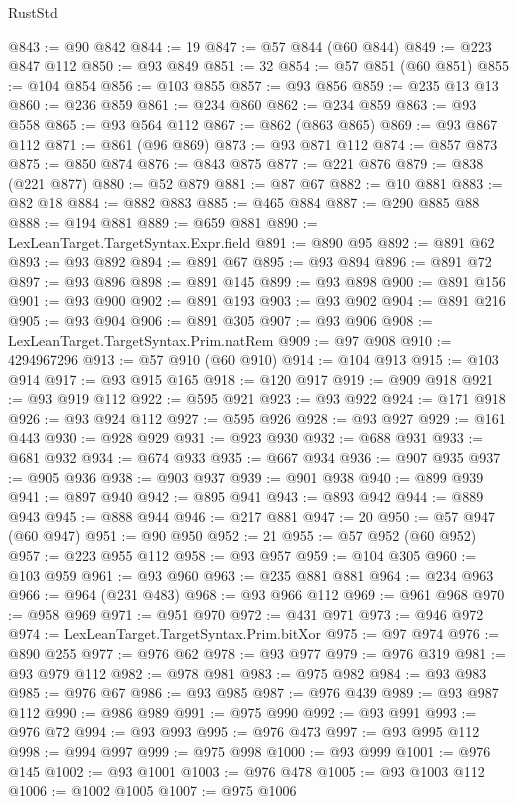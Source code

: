 \begin{lexlean}{RustStd}
\begin{coremodule}
@843 := @90 @842
@844 := 19
@847 := @57 @844 (@60 @844)
@849 := @223 @847 @112
@850 := @93 @849
@851 := 32
@854 := @57 @851 (@60 @851)
@855 := @104 @854
@856 := @103 @855
@857 := @93 @856
@859 := @235 @13 @13
@860 := @236 @859
@861 := @234 @860
@862 := @234 @859
@863 := @93 @558
@865 := @93 @564 @112
@867 := @862 (@863 @865)
@869 := @93 @867 @112
@871 := @861 (@96 @869)
@873 := @93 @871 @112
@874 := @857 @873
@875 := @850 @874
@876 := @843 @875
@877 := @221 @876
@879 := @838 (@221 @877)
@880 := @52 @879
@881 := @87 @67
@882 := @10 @881
@883 := @82 @18
@884 := @882 @883
@885 := @465 @884
@887 := @290 @885 @88
@888 := @194 @881
@889 := @659 @881
@890 := LexLeanTarget.TargetSyntax.Expr.field
@891 := @890 @95
@892 := @891 @62
@893 := @93 @892
@894 := @891 @67
@895 := @93 @894
@896 := @891 @72
@897 := @93 @896
@898 := @891 @145
@899 := @93 @898
@900 := @891 @156
@901 := @93 @900
@902 := @891 @193
@903 := @93 @902
@904 := @891 @216
@905 := @93 @904
@906 := @891 @305
@907 := @93 @906
@908 := LexLeanTarget.TargetSyntax.Prim.natRem
@909 := @97 @908
@910 := 4294967296
@913 := @57 @910 (@60 @910)
@914 := @104 @913
@915 := @103 @914
@917 := @93 @915 @165
@918 := @120 @917
@919 := @909 @918
@921 := @93 @919 @112
@922 := @595 @921
@923 := @93 @922
@924 := @171 @918
@926 := @93 @924 @112
@927 := @595 @926
@928 := @93 @927
@929 := @161 @443
@930 := @928 @929
@931 := @923 @930
@932 := @688 @931
@933 := @681 @932
@934 := @674 @933
@935 := @667 @934
@936 := @907 @935
@937 := @905 @936
@938 := @903 @937
@939 := @901 @938
@940 := @899 @939
@941 := @897 @940
@942 := @895 @941
@943 := @893 @942
@944 := @889 @943
@945 := @888 @944
@946 := @217 @881
@947 := 20
@950 := @57 @947 (@60 @947)
@951 := @90 @950
@952 := 21
@955 := @57 @952 (@60 @952)
@957 := @223 @955 @112
@958 := @93 @957
@959 := @104 @305
@960 := @103 @959
@961 := @93 @960
@963 := @235 @881 @881
@964 := @234 @963
@966 := @964 (@231 @483)
@968 := @93 @966 @112
@969 := @961 @968
@970 := @958 @969
@971 := @951 @970
@972 := @431 @971
@973 := @946 @972
@974 := LexLeanTarget.TargetSyntax.Prim.bitXor
@975 := @97 @974
@976 := @890 @255
@977 := @976 @62
@978 := @93 @977
@979 := @976 @319
@981 := @93 @979 @112
@982 := @978 @981
@983 := @975 @982
@984 := @93 @983
@985 := @976 @67
@986 := @93 @985
@987 := @976 @439
@989 := @93 @987 @112
@990 := @986 @989
@991 := @975 @990
@992 := @93 @991
@993 := @976 @72
@994 := @93 @993
@995 := @976 @473
@997 := @93 @995 @112
@998 := @994 @997
@999 := @975 @998
@1000 := @93 @999
@1001 := @976 @145
@1002 := @93 @1001
@1003 := @976 @478
@1005 := @93 @1003 @112
@1006 := @1002 @1005
@1007 := @975 @1006

\end{coremodule}
\end{lexlean}
